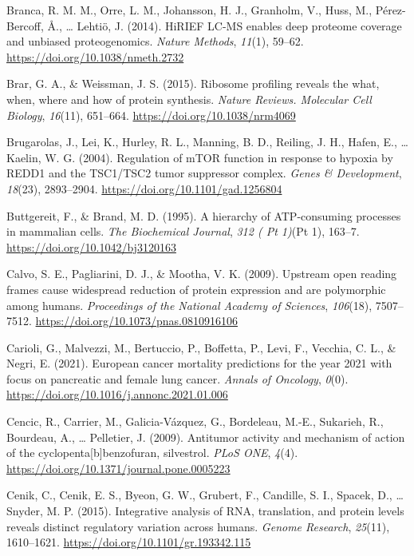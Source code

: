 \documentclass[12pt,openany]{book}
\begin{document}
\hypertarget{ref-Branca2014}{}
Branca, R. M. M., Orre, L. M., Johansson, H. J., Granholm, V., Huss, M.,
Pérez-Bercoff, Å., \ldots{} Lehtiö, J. (2014). HiRIEF LC-MS enables deep
proteome coverage and unbiased proteogenomics. \emph{Nature Methods},
\emph{11}(1), 59--62. \url{https://doi.org/10.1038/nmeth.2732}

\hypertarget{ref-Brar2015}{}
Brar, G. A., \& Weissman, J. S. (2015). Ribosome profiling reveals the
what, when, where and how of protein synthesis. \emph{Nature Reviews.
Molecular Cell Biology}, \emph{16}(11), 651--664.
\url{https://doi.org/10.1038/nrm4069}

\hypertarget{ref-Brugarolas2004}{}
Brugarolas, J., Lei, K., Hurley, R. L., Manning, B. D., Reiling, J. H.,
Hafen, E., \ldots{} Kaelin, W. G. (2004). Regulation of mTOR function in
response to hypoxia by REDD1 and the TSC1/TSC2 tumor suppressor complex.
\emph{Genes \& Development}, \emph{18}(23), 2893--2904.
\url{https://doi.org/10.1101/gad.1256804}

\hypertarget{ref-Buttgereit1995}{}
Buttgereit, F., \& Brand, M. D. (1995). A hierarchy of ATP-consuming
processes in mammalian cells. \emph{The Biochemical Journal}, \emph{312
( Pt 1)}(Pt 1), 163--7. \url{https://doi.org/10.1042/bj3120163}

\hypertarget{ref-Calvo2009}{}
Calvo, S. E., Pagliarini, D. J., \& Mootha, V. K. (2009). Upstream open
reading frames cause widespread reduction of protein expression and are
polymorphic among humans. \emph{Proceedings of the National Academy of
Sciences}, \emph{106}(18), 7507--7512.
\url{https://doi.org/10.1073/pnas.0810916106}

\hypertarget{ref-Carioli2021}{}
Carioli, G., Malvezzi, M., Bertuccio, P., Boffetta, P., Levi, F.,
Vecchia, C. L., \& Negri, E. (2021). European cancer mortality
predictions for the year 2021 with focus on pancreatic and female lung
cancer. \emph{Annals of Oncology}, \emph{0}(0).
\url{https://doi.org/10.1016/j.annonc.2021.01.006}

\hypertarget{ref-Cencic2009}{}
Cencic, R., Carrier, M., Galicia-Vázquez, G., Bordeleau, M.-E.,
Sukarieh, R., Bourdeau, A., \ldots{} Pelletier, J. (2009). Antitumor
activity and mechanism of action of the cyclopenta{[}b{]}benzofuran,
silvestrol. \emph{PLoS ONE}, \emph{4}(4).
\url{https://doi.org/10.1371/journal.pone.0005223}

\hypertarget{ref-Cenik2015}{}
Cenik, C., Cenik, E. S., Byeon, G. W., Grubert, F., Candille, S. I.,
Spacek, D., \ldots{} Snyder, M. P. (2015). Integrative analysis of RNA,
translation, and protein levels reveals distinct regulatory variation
across humans. \emph{Genome Research}, \emph{25}(11), 1610--1621.
\url{https://doi.org/10.1101/gr.193342.115}
\end{document}
